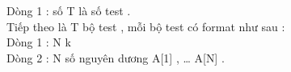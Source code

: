Dòng 1 : số T là số test .   
\\   Tiếp theo là T bộ test , mỗi bộ test có format như sau :   
\\   Dòng 1 : N k   
\\   Dòng 2 : N số nguyên dương A[1] , … A[N] .   
\\